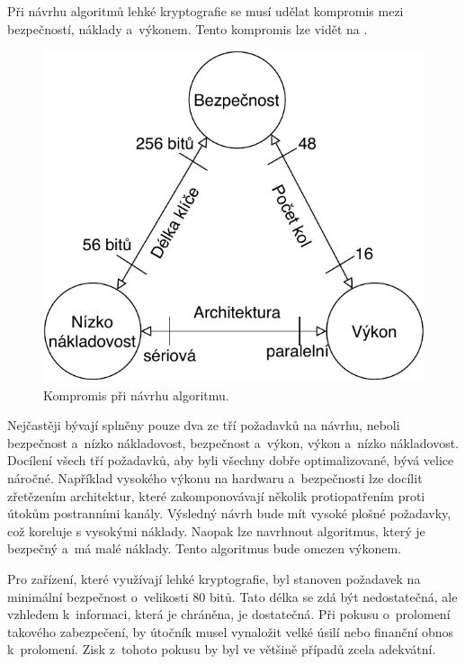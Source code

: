 Při návrhu algoritmů lehké kryptografie se musí udělat kompromis mezi bezpečností, náklady a~výkonem. Tento kompromis lze vidět na . 
\begin{figure}[!h]
  \begin{center}
    \includegraphics[scale=0.7]{obrazky/designTradeOFF.pdf}
  \end{center}
  \caption[Kompromis při návrhu algoritmu]{Kompromis při návrhu algoritmu.\cite{FeistelCipher}}
  \label{img:Compromis}
\end{figure}

Nejčastěji bývají splněny pouze dva ze tří požadavků na návrhu, neboli bezpečnost a~nízko nákladovost, bezpečnost a~výkon, výkon a~nízko nákladovost. Docílení všech tří požadavků, aby byli všechny dobře optimalizované, bývá velice náročné. Například vysokého výkonu na hardwaru a~bezpečnosti lze docílit zřetězením architektur, které zakomponovávají několik protiopatřením proti útokům postranními kanály. Výsledný návrh bude mít vysoké plošné požadavky, což koreluje s vysokými náklady. Naopak lze navrhnout algoritmus, který je bezpečný a~má malé náklady. Tento algoritmus bude omezen výkonem.\cite{PoschmannCrypto}

Pro zařízení, které využívají lehké kryptografie, byl stanoven požadavek na minimální bezpečnost o~velikosti 80 bitů. Tato délka se zdá být nedostatečná, ale vzhledem k~informaci, která je chráněna, je dostatečná. Při pokusu o~prolomení takového zabezpečení, by útočník musel vynaložit velké úsilí nebo finanční obnos k~prolomení. Zisk z~tohoto pokusu by byl ve většině případů zcela adekvátní.

